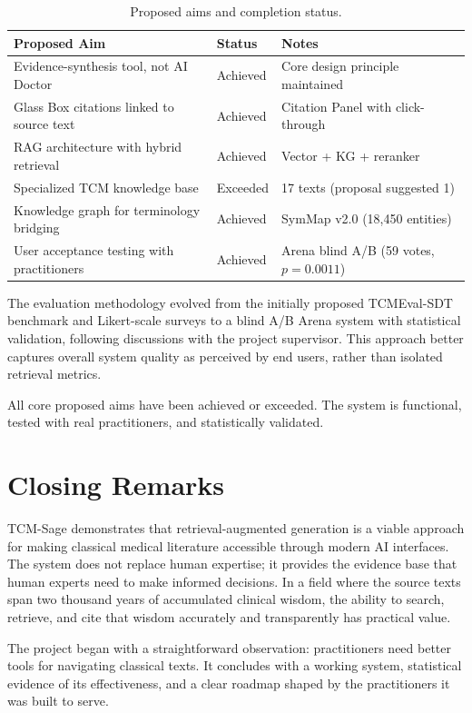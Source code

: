 \begin{table}[H]
\centering
\caption{Proposed aims and completion status.}
\begin{tabularx}{\textwidth}{Xll}
\toprule
\textbf{Proposed Aim} & \textbf{Status} & \textbf{Notes} \\
\midrule
Evidence-synthesis tool, not AI Doctor & Achieved & Core design principle maintained \\
Glass Box citations linked to source text & Achieved & Citation Panel with click-through \\
RAG architecture with hybrid retrieval & Achieved & Vector + KG + reranker \\
Specialized TCM knowledge base & Exceeded & 17 texts (proposal suggested 1) \\
Knowledge graph for terminology bridging & Achieved & SymMap v2.0 (18,450 entities) \\
User acceptance testing with practitioners & Achieved & Arena blind A/B (59 votes, $p=0.0011$) \\
\bottomrule
\end{tabularx}
\end{table}

The evaluation methodology evolved from the initially proposed TCMEval-SDT benchmark and Likert-scale surveys to a blind A/B Arena system with statistical validation, following discussions with the project supervisor. This approach better captures overall system quality as perceived by end users, rather than isolated retrieval metrics.

All core proposed aims have been achieved or exceeded. The system is functional, tested with real practitioners, and statistically validated.

\section{Closing Remarks}

TCM-Sage demonstrates that retrieval-augmented generation is a viable approach for making classical medical literature accessible through modern AI interfaces. The system does not replace human expertise; it provides the evidence base that human experts need to make informed decisions. In a field where the source texts span two thousand years of accumulated clinical wisdom, the ability to search, retrieve, and cite that wisdom accurately and transparently has practical value.

The project began with a straightforward observation: practitioners need better tools for navigating classical texts. It concludes with a working system, statistical evidence of its effectiveness, and a clear roadmap shaped by the practitioners it was built to serve.
